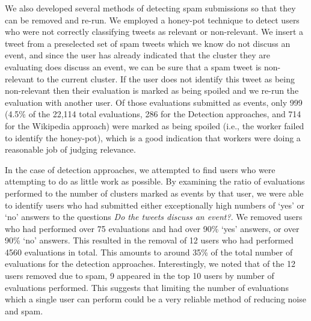We also developed several methods of detecting spam submissions so that they can be removed and re-run.
We employed a honey-pot technique to detect users who were not correctly classifying tweets as relevant or non-relevant.
We insert a tweet from a preselected set of spam tweets which we know do not discuss an event, and since the user has already indicated that the cluster they are evaluating does discuss an event, we can be sure that a spam tweet is non-relevant to the current cluster.
If the user does not identify this tweet as being non-relevant then their evaluation is marked as being spoiled and we re-run the evaluation with another user.
Of those evaluations submitted as events, only 999 (4.5\% of the 22,114 total evaluations, 286 for the Detection approaches, and 714 for the Wikipedia approach) were marked as being spoiled (i.e., the worker failed to identify the honey-pot), which is a good indication that workers were doing a reasonable job of judging relevance.

In the case of detection approaches, we attempted to find users who were attempting to do as little work as possible. By examining the ratio of evaluations performed to the number of clusters marked as events by that user, we were able to identify users who had submitted either exceptionally high numbers of `yes' or `no' answers to the questions \emph{Do the tweets discuss an event?}.
We removed users who had performed over 75 evaluations and had over 90\% `yes' answers, or over 90\% `no' answers.
This resulted in the removal of 12 users who had performed 4560 evaluations in total.
This amounts to around 35\% of the total number of evaluations for the detection approaches.
Interestingly, we noted that of the 12 users removed due to spam, 9 appeared in the top 10 users by number of evaluations performed.
This suggests that limiting the number of evaluations which a single user can perform could be a very reliable method of reducing noise and spam.

